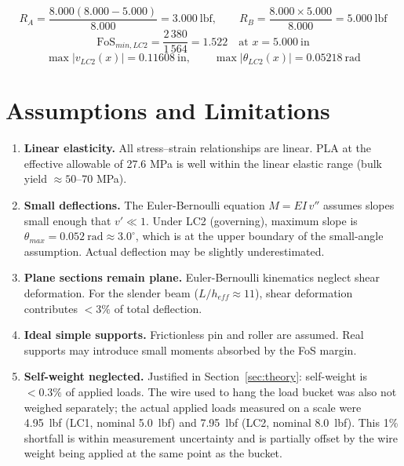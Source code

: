 \documentclass[11pt,letterpaper]{article}
\begin{document}
\[
  R_A = \frac{8.000(8.000 - 5.000)}{8.000} = 3.000\ \mathrm{lbf},
  \qquad
  R_B = \frac{8.000 \times 5.000}{8.000} = 5.000\ \mathrm{lbf}
\]
\[
  \mathrm{FoS}_{min,LC2}
  = \frac{2\,380}{1\,564} = 1.522
  \quad \text{at } x = 5.000\ \mathrm{in}
\]
\[
  \max|v_{LC2}(x)| = 0.11608\ \mathrm{in},
  \qquad
  \max|\theta_{LC2}(x)| = 0.05218\ \mathrm{rad}
\]


\section{Assumptions and Limitations}
\label{sec:assumptions}

\begin{enumerate}
  \item \textbf{Linear elasticity.}
    All stress--strain relationships are linear.  PLA at the effective
    allowable of 27.6 MPa is well within the linear elastic range
    (bulk yield $\approx 50$--70 MPa).

  \item \textbf{Small deflections.}
    The Euler-Bernoulli equation $M = EI\,v''$ assumes slopes small enough
    that $v' \ll 1$.  Under LC2 (governing), maximum slope is
    $\theta_{max} = 0.052\ \mathrm{rad} \approx 3.0^\circ$, which is at the upper
    boundary of the small-angle assumption.  Actual deflection may be
    slightly underestimated.

  \item \textbf{Plane sections remain plane.}
    Euler-Bernoulli kinematics neglect shear deformation.  For the slender
    beam ($L/h_{eff} \approx 11$), shear deformation contributes $< 3\%$
    of total deflection.

  \item \textbf{Ideal simple supports.}
    Frictionless pin and roller are assumed.  Real supports may introduce
    small moments absorbed by the FoS margin.

  \item \textbf{Self-weight neglected.}
    Justified in Section~\ref{sec:theory}: self-weight is $< 0.3\%$ of
    applied loads.  The wire used to hang the load bucket was also not weighed
    separately; the actual applied loads measured on a scale were
    4.95~lbf (LC1, nominal 5.0~lbf) and 7.95~lbf (LC2, nominal 8.0~lbf).
    This 1\% shortfall is within measurement uncertainty and is partially
    offset by the wire weight being applied at the same point as the bucket.


\end{enumerate}
\end{document}
